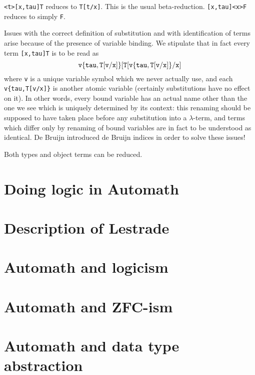 \documentclass[12pt]{article}
\begin{document}
{\tt <t>[x,tau]T} reduces to {\tt T[t/x]}.  This is the usual beta-reduction.  {\tt [x,tau]<x>F} reduces to simply {\tt F}.

Issues with the correct definition of substitution and with identification of terms arise because of the presence of variable binding.  We stipulate that in fact
every term {\tt [x,tau]T} is to be read as $${\tt v\{tau,T[v/x]\}[T[v\{tau,T[v/x]\}/x]}$$ where {\tt v} is a unique variable symbol which we never actually use,
and each {\tt v\{tau,T[v/x]\}} is another atomic variable (certainly substitutions have no effect on it).  In other words, every bound variable has an actual name
other than the one we see which is uniquely determined by its context:  this renaming should be supposed to have taken place before any substitution into a $\lambda$-term, and terms which differ only by renaming of bound variables are in fact to be understood as identical.   De Bruijn introduced de Bruijn indices in order to solve these issues!

Both types and object terms can be reduced.


\newpage

\section{Doing logic in Automath}

\newpage

\section{Description of Lestrade}

\newpage

\section{Automath and logicism}

\newpage

\section{Automath and ZFC-ism}

\newpage

\section{Automath and data type abstraction}
\end{document}
